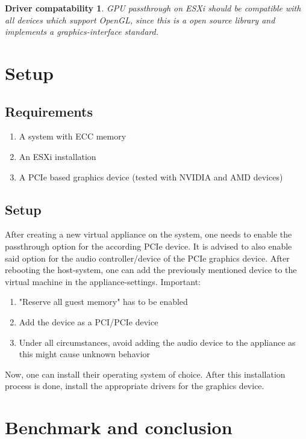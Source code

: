 \documentclass[12pt,a4paper]{report}
\newtheorem*{theorem2}{Driver compatability}
\begin{document}
\begin{theorem2}
GPU passthrough on ESXi should be compatible with all devices which support OpenGL, since this is a open source library and implements a graphics-interface standard.
\end{theorem2}

\chapter{Setup}

\section{Requirements}

\begin{enumerate}
\item A system with ECC memory
\item An ESXi installation
\item A PCIe based graphics device (tested with NVIDIA and AMD devices)
\end{enumerate}

\section{Setup}

After creating a new virtual appliance on the system, one needs to enable the passthrough option for the according PCIe device. It is advised to also enable said option for the audio controller/device of the PCIe graphics device. After rebooting the host-system, one can add the previously mentioned device to the virtual machine in the appliance-settings.
\newline
Important:
\begin{enumerate}
\item "Reserve all guest memory" has to be enabled
\item Add the device as a PCI/PCIe device
\item Under all circumstances, avoid adding the audio device to the appliance as this might cause unknown behavior
\end{enumerate}
Now, one can install their operating system of choice. After this installation process is done, install the appropriate drivers for the graphics device.

\chapter{Benchmark and conclusion}
\end{document}
